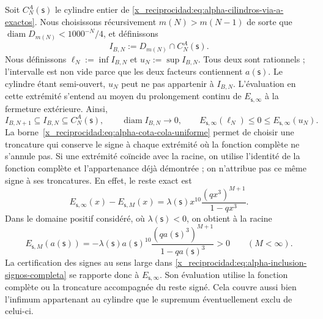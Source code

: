 Soit \(C_N^A(\mathsf s)\) le cylindre entier de \eqref{x_reciprocidad:eq:alpha-cilindros-via-a-exactos}. Nous choisissons récursivement \(m(N)>m(N-1)\) de sorte que \(\operatorname{diam}D_{m(N)}<1000^{-N}/4\), et définissons
\begin{equation}
I_{B,N}:=D_{m(N)}\cap C_N^A(\mathsf s).
 \label{x_reciprocidad:eq:alpha-intervalos-b-completos}
\end{equation}
Nous définissons
\(\ell_N:=\inf I_{B,N}\) et \(u_N:=\sup I_{B,N}\). Tous deux sont rationnels ;
l'intervalle est non vide parce que les deux facteurs contiennent
\(a(\mathsf s)\). Le cylindre étant semi-ouvert, \(u_N\) peut ne pas
appartenir à \(I_{B,N}\). L'évaluation en cette extrémité s'entend au moyen
du prolongement continu de \(E_{\mathsf s,\infty}\) à la fermeture extérieure. Ainsi,
\begin{equation}
 I_{B,N+1}\subseteq I_{B,N}\subseteq C_N^A(\mathsf s),
 \qquad \operatorname{diam}I_{B,N}\longrightarrow0,
 \qquad E_{\mathsf s,\infty}(\ell_N)\leq0\leq
 E_{\mathsf s,\infty}(u_N).
 \label{x_reciprocidad:eq:alpha-inclusion-signos-completa}
\end{equation}
La borne~\eqref{x_reciprocidad:eq:alpha-cota-cola-uniforme} permet de choisir une
troncature qui conserve le signe à chaque extrémité où la fonction complète
ne s'annule pas. Si une extrémité coïncide avec la racine, on utilise l'identité de
la fonction complète et l'appartenance déjà démontrée ; on n'attribue pas ce même
signe à ses troncatures. En effet, le reste exact est
\[
 E_{\mathsf s,\infty}(x)-E_{\mathsf s,M}(x)
 =\lambda(\mathsf s)x^{10}
   \frac{(qx^3)^{M+1}}{1-qx^3}.
\]
Dans le domaine positif considéré, où \(\lambda(\mathsf s)<0\), on obtient à la racine
\[
 E_{\mathsf s,M}(a(\mathsf s))
 =-\lambda(\mathsf s)a(\mathsf s)^{10}
   \frac{(qa(\mathsf s)^3)^{M+1}}{1-qa(\mathsf s)^3}>0
 \qquad(M<\infty).
\]
La certification des signes au sens large dans \eqref{x_reciprocidad:eq:alpha-inclusion-signos-completa} se rapporte donc à \(E_{\mathsf s,\infty}\). Son évaluation utilise la fonction complète ou la troncature accompagnée du reste signé. Cela couvre aussi bien l'infimum appartenant au cylindre que le supremum éventuellement exclu de celui-ci.


